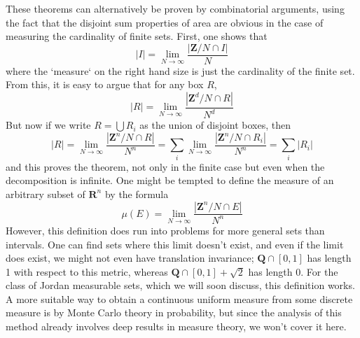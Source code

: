 \begin{remark}
These theorems can alternatively be proven by combinatorial arguments, using the fact that the disjoint sum properties of area are obvious in the case of measuring the cardinality of finite sets. First, one shows that
%
\[ |I| = \lim_{N \to \infty} \frac{|\mathbf{Z}/N \cap I|}{N} \]
%
where the `measure` on the right hand size is just the cardinality of the finite set. From this, it is easy to argue that for any box $R$,
%
\[ |R| = \lim_{N \to \infty} \frac{|\mathbf{Z}^d/N \cap R|}{N^d} \]
%
But now if we write $R = \bigcup R_i$ as the union of disjoint boxes, then
%
\[ |R| = \lim_{N \to \infty} \frac{|\mathbf{Z}^n/N \cap R|}{N^n} = \sum_i \lim_{N \to \infty} \frac{|\mathbf{Z}^n/N \cap R_i|}{N^n} = \sum_i |R_i| \]
%
and this proves the theorem, not only in the finite case but even when the decomposition is infinite. One might be tempted to define the measure of an arbitrary subset of $\mathbf{R}^n$ by the formula
%
\[ \mu(E) = \lim_{N \to \infty} \frac{|\mathbf{Z}^n/N \cap E|}{N^n} \]
%
However, this definition does run into problems for more general sets than intervals. One can find sets where this limit doesn't exist, and even if the limit does exist, we might not even have translation invariance; $\mathbf{Q} \cap [0,1]$ has length 1 with respect to this metric, whereas $\mathbf{Q} \cap [0,1] + \sqrt{2}$ has length 0. For the class of Jordan measurable sets, which we will soon discuss, this definition works. A more suitable way to obtain a continuous uniform measure from some discrete measure is by Monte Carlo theory in probability, but since the analysis of this method already involves deep results in measure theory, we won't cover it here.
\end{remark}

%
%
%
%
%
%
%
%
%
%
%

